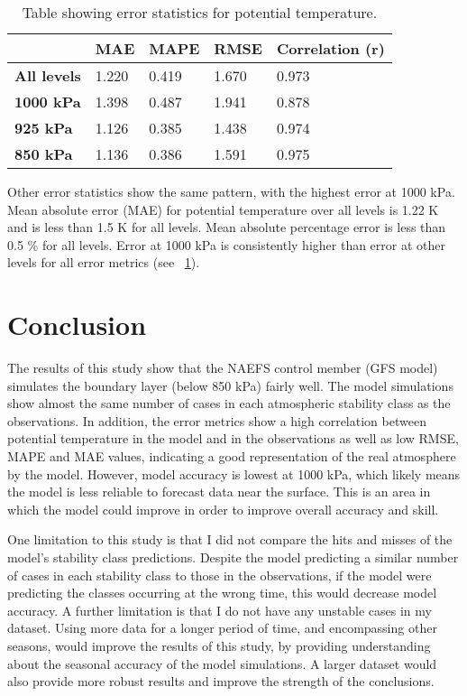 \documentclass[12pt]{article}
\begin{document}
\begin{table}[]
    \centering
    \caption{Table showing error statistics for potential temperature.}
    \begin{tabular}{|l|l|l|l|l|}
    \hline
                        & \textbf{MAE} & \textbf{MAPE} & \textbf{RMSE} & \textbf{Correlation (r)} \\ \hline
    \textbf{All levels} & 1.220        & 0.419         & 1.670         & 0.973                    \\ \hline
    \textbf{1000 kPa}   & 1.398        & 0.487         & 1.941         & 0.878                    \\ \hline
    \textbf{925 kPa}    & 1.126        & 0.385         & 1.438         & 0.974                    \\ \hline
    \textbf{850 kPa}    & 1.136        & 0.386         & 1.591         & 0.975                    \\ \hline
    \end{tabular}
    \label{table:error}
\end{table}

Other error statistics show the same pattern, with the highest error at 1000 kPa. 
Mean absolute error (MAE) for potential temperature over all levels is 1.22 K 
and is less than 1.5 K for all levels. Mean absolute percentage error is less than 
0.5 \% for all levels. Error at 1000 kPa is consistently higher than error at other 
levels for all error metrics (see ~\ref{table:error}). 


\section{Conclusion}


The results of this study show that the NAEFS control member (GFS model) simulates 
the boundary layer (below 850 kPa) fairly well. The model simulations show almost the 
same number of cases in each atmospheric stability class as the observations. In addition, 
the error metrics show a high correlation between potential temperature in the model and 
in the observations as well as low RMSE, MAPE and MAE values, indicating a good 
representation of the real atmosphere by the model. However, model accuracy is lowest 
at 1000 kPa, which likely means the model is less reliable to forecast data near the 
surface. This is an area in which the model could improve in order to improve overall 
accuracy and skill. 

One limitation to this study is that I did not compare the hits and misses of the model’s 
stability class predictions. Despite the model predicting a similar number of cases in 
each stability class to those in the observations, if the model were predicting the 
classes occurring at the wrong time, this would decrease model accuracy. A further 
limitation is that I do not have any unstable cases in my dataset. Using more data for 
a longer period of time, and encompassing other seasons, would improve the results of 
this study, by providing understanding about the seasonal accuracy of the model simulations. 
A larger dataset would also provide more robust results and improve the strength of 
the conclusions. 
\end{document}
